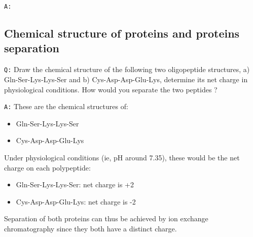 \documentclass[11pt, a4paper,titlepage]{article}
\begin{document}
\texttt{A:}
\subsection{Chemical structure of proteins and proteins separation}
\label{sec-2-2}

\texttt{Q:} Draw the chemical structure of the following two oligopeptide
structures, a) Gln-Ser-Lys-Lys-Ser and b) Cys-Asp-Asp-Glu-Lys,
determine its net charge in physiological conditions. How would you
separate the two peptides ?  

\texttt{A:} These are the chemical structures of:
\begin{itemize}
\item Gln-Ser-Lys-Lys-Ser

  \setatomsep{25pt}
\item Cys-Asp-Asp-Glu-Lys

  \setatomsep{25pt}
\end{itemize}

Under physiological conditions (ie, pH around 7.35), these would be
the net charge on each polypeptide:

\begin{itemize}
\item Gln-Ser-Lys-Lys-Ser: net charge is +2

\item Cys-Asp-Asp-Glu-Lys: net charge is -2

\end{itemize}

Separation of both proteins can thus be achieved by ion exchange
chromatography since they both have a distinct charge.
\end{document}
